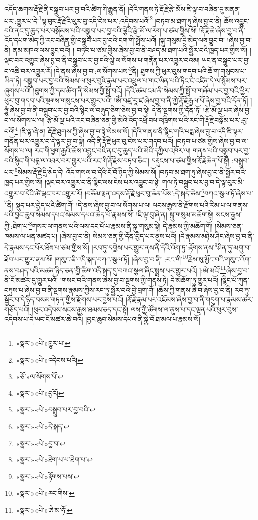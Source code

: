 འདོད་ཆགས་རྡོ་རྗེ་ནི་བསྒྲུབ་པར་བྱ་བའི་ཚིག་གི་རྒྱུན་ནོ། །དེའི་གནས་ཏེ་རྡོ་རྗེ་རྩེ་མོས་ཇི་ལྟ་བ་བཞིན་དུ་མནན་པར་:གྱུར་པ་དེ་\footnote{«སྣར་»«པེ་»གྱུར་པ་}ལྟ་བུར་རྡོ་རྗེའི་ཕུར་བུ་འདི་ངེས་པར་:འདེབས་པའོ།\footnote{«སྣར་»«པེ་»འདེབས་པའི།} །བཏབ་མ་ཐག་ཏུ་ཞེས་བྱ་བ་ནི། ཆོས་འབྱུང་བའི་ནང་དུ་ཆུད་པར་བསྒོམས་པའི་བསྒྲུབ་པར་བྱ་བའི་ལྕེའི་རྩེ་མོ་ལ་རེག་པ་ཙམ་གྱིས་སོ། །རྡོ་རྗེ་ཆེ་ཞེས་བྱ་བ་ནི་འོད་དཔག་མེད་ཀྱི་རང་བཞིན་གྱི་བསྒྲུབ་པར་བྱ་བའི་ངག་གི་སྤྲོས་པའོ། །སྐུ་གསུམ་དྲི་མེད་ལས་བྱུང་བ། །ཞེས་བྱ་བ་ནི། ནམ་མཁའ་ལས་བྱུང་བའོ། །
བཏབ་པ་ཙམ་གྱིས་ཞེས་བྱ་བ་ནི་བཤད་མ་ཐག་པའི་སྦྱོར་བའི་ཁྱད་པར་གྱིས་སོ། །ལྡང་བར་འགྱུར་ཞེས་བྱ་བ་ནི་བསྒྲུབ་པར་བྱ་བའི་ལྕེ་ལ་སོགས་པ་གནོན་པར་འགྱུར་བའམ། ཡང་ན་བསྒྲུབ་པར་བྱ་བ་འཆི་བར་འགྱུར་རོ། །དེ་ནས་ཞེས་བྱ་བ་:ལ་སོགས་པས་\footnote{«ཅོ་»ལ་སོགས་པོ་}ནི། ཐུགས་ཀྱི་ཕུར་བུས་གདབ་པའི་ཆོ་ག་གསུངས་པ་ཡིན་ཏེ། བསྒྲུབ་པར་བྱ་བའི་སེམས་ལ་ཕུར་བུའི་རྣམ་པར་འཕྲུལ་པ་གང་ཡིན་པའི་ཏིང་ངེ་འཛིན་དེ་ལ་སྙོམས་པར་ཞུགས་པའོ། །ཐུགས་ཀྱི་དམ་ཚིག་ནི་སེམས་ཀྱི་སྤྲོ་བའོ། །དེའི་ཚམ་ངམ་ནི་སེམས་ཀྱི་སྤྲོ་བ་གཞོམ་པར་བྱ་བའི་ཕྱིར་ཕུར་བུ་གདབ་པའི་སྔགས་གསུངས་པར་གྱུར་པའོ། །ཨོཾ་བཛྲ་རཱ་ཛ་ཞེས་བྱ་བ་ནི་ཀྱེ་རྡོ་རྗེ་རྒྱལ་པོ་ཞེས་བྱ་བའི་དོན་ཏོ། །ཧཱུཾ་ཞེས་བྱ་བ་ནི་བསྒྲུབ་པར་བྱ་བའི་སྙིང་ལ་བཞུད་ཅིག་ཅེས་བྱ་བ་སྟེ། དེ་ནི་སྔགས་ཀྱི་དོན་ཏོ། །རྩེ་མོ་ལྔ་པར་ཞེས་བྱ་བ་ལ་སོགས་པ་ལ། རྩེ་མོ་ལྔ་པའི་རང་བཞིན་ཅན་གྱི་མེའི་འོད་འཕྲོ་བས་འཁྲིགས་པའི་རང་གི་རྡོ་རྗེ་བསྒོམ་པར་:བྱ་བའོ།\footnote{«སྣར་»«པེ་»བྱའོ།} །ཇི་ལྟ་ཞེ་ན། རྡོ་རྗེ་ཐུགས་ཀྱི་ཞེས་བྱ་བ་སྟེ་སེམས་སོ། །དེའི་གནས་ནི་སྙིང་གའི་པདྨ་ཞེས་བྱ་བ་འདི་ཇི་ལྟར་གནོན་པར་འགྱུར་བ་དེ་ལྟར་བྱ་བ་སྟེ། འདི་ནི་རྡོ་རྗེ་ཕུར་བུ་ངེས་པར་གདབ་པའོ། །བཏབ་པ་ཙམ་གྱིས་ཞེས་བྱ་བ་ལ་སོགས་པ་ལ། རང་གི་ཕྱག་རྒྱའི་ཆོས་འབྱུང་བའི་ནང་དུ་ཆུད་པའི་མེའི་དཀྱིལ་འཁོར་ལ། གནས་པའི་བསྒྲུབ་པར་བྱ་བའི་སྙིང་གི་པདྨ་ལ་འབར་བར་གྱུར་པའི་རང་གི་རྡོ་རྗེས་བཏབ་ཅིང་། བརྡུངས་པ་ཙམ་གྱིས་རྡོ་རྗེ་ཆེན་པོ་སྟེ། :བསྒྲུབ་པར་\footnote{«སྣར་»«པེ་»བསྒྲུབ་པར་བྱ་བའི་}སེམས་རྡོ་རྗེ་དྲི་མེད་དེ། འོད་གསལ་བ་དེའི་ངོ་བོ་ཉིད་ཀྱི་སེམས་སོ། །བཏབ་མ་ཐག་ཏུ་ཞེས་བྱ་བ་ནི་སྦྱོར་བའི་ཁྱད་པར་གྱིས་སོ། །ལྡང་བར་འགྱུར་བ་ནི་སྙིང་ལས་ངེས་པར་འབྱུང་བ་སྟེ། གལ་ཏེ་བསྒྲུབ་པར་བྱ་བ་དེ་ལྟ་བུར་མི་འགྱུར་བ་དེའི་ཚེ་ལྡང་བར་འགྱུར་རོ། །བཅོམ་ལྡན་འདས་རྡོ་རྗེ་ཕུར་བུ་ཆེན་པོས་:དེ་སྐད་ཅེས་\footnote{«སྣར་»«པེ་»དེ་སྐད་}བཀའ་སྩལ་ཏོ་ཞེས་པ་\footnote{«སྣར་»«པེ་»བྱ་བ་}ནི། སྡུད་པར་བྱེད་པའི་ཚིག་གོ། །དེ་ནས་ཞེས་བྱ་བ་ལ་སོགས་པ་ལ། སངས་རྒྱས་ནི་རྫོགས་པའི་རིམ་པ་ལ་གནས་པའི་བྱང་ཆུབ་སེམས་དཔའ་སེམས་དཔའ་ཆེན་པོ་རྣམས་སོ། །ཇི་ལྟ་བུ་ཞེ་ན། སྐུ་གསུམ་མཆོག་སྟེ། སངས་རྒྱས་ཀྱི་:ཐེག་པ་\footnote{«སྣར་»«པེ་»ཐེག་པ་པ་ཐེག་པ་}གསར་ལ་གནས་པའི་ལས་དང་པོ་པ་རྣམས་ནི་སྐུ་གསུམ་སྟེ། དེ་རྣམས་ཀྱི་མཆོག་གོ། །སེམས་ཅན་ཁམས་ལ་ཕན་མཛད་པ། །ཞེས་བྱ་བ་ནི། སེམས་ཅན་གྱི་དོན་བྱེད་པར་ནུས་པའོ། །དེ་རྣམས་མཉེས་ཤིང་ཞེས་བྱ་བ་ནི་དེ་རྣམས་དང་པོར་ཐོས་པ་ཙམ་གྱིས་སོ། །རབ་ཏུ་དགྱེས་པར་གྱུར་ནས་ནི་དེའི་འོག་ཏུ་:རྟོགས་ནས་\footnote{«སྣར་»«པེ་»རྟོགས་པས་}ཤིན་ཏུ་མགུ་བ་ཐོབ་པར་གྱུར་ནས་སོ། །གསུང་ནི་འདི་སྐད་བཀའ་སྩལ་ཏོ། །ཞེས་བྱ་བ་ནི། :རང་གི་\footnote{«སྣར་»«པེ་»རང་གིས་}རྗེས་སུ་མྱོང་བའི་གསུང་འོག་ནས་བཤད་པའི་མཚན་ཉིད་ཅན་གྱི་ཚིག་འདི་སྐད་དུ་བཀའ་སྩལ་ཞིང་སྨྲས་པར་གྱུར་པའོ། །:ཨེ་མའོ་\footnote{«སྣར་»«པེ་»ཨེ་མ་ཧོ་}ཞེས་བྱ་བ་ནི་ངོ་མཚར་དུ་གྱུར་པའོ། །གསང་བའི་གནས་ཞེས་བྱ་བ་སྔགས་ཀྱི་གནས་ཏེ། དེ་མཆོག་ཏུ་གྱུར་པའོ། །སྙིང་པོ་ཀུན་བཏུས་པ་ཞེས་བྱ་བ་ནི་སྔགས་རྣམས་ཀྱིས་རབ་ཏུ་སྦྱོར་བའི་བྱེ་བྲག་གོ། །ཆོས་ཀྱི་གནས་ཞི་བ་ཞེས་བྱ་བ་ནི། རབ་ཏུ་སྦྱོར་བ་དེ་ཉིད་བསམ་གཏན་གྱིས་རྫོགས་པར་བྱས་པའོ། །རྡོ་རྗེ་རྣམ་པར་འཇོམས་ཞེས་བྱ་བ་ནི་གདུག་པ་རྣམས་ཚར་གཅོད་པའོ། །ཕུར་འདེབས་སངས་རྒྱས་ཐམས་ཅད་དང་སྟེ། ལས་ཀྱི་ཚོགས་ལ་ནུས་པ་དང་ལྡན་པའི་ཕུར་བུས་འདེབས་པ་དེ་ཡང་ངོ་མཚར་ཆེ་བའོ། །བྱང་ཆུབ་སེམས་དཔའ་ནི་སྐྱེ་བོ་ཐ་མལ་པ་རྣམས་སོ། 